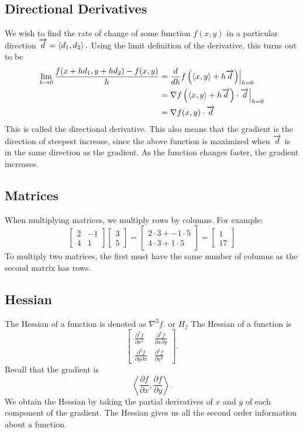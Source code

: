 \documentclass[12pt]{article}
\theoremstyle{plain} %
\theoremstyle{definition}
\theoremstyle{definition}
\theoremstyle{definition}
\theoremstyle{remark}
\newcommand{\angled}[1]{\left\langle {#1} \right\rangle}
\newcommand*{\vv}[1]{\overrightarrow{\mkern0mu#1}}
\begin{document}
\subsection{Directional Derivatives}
We wish to find the rate of change of some function $f(x,y)$ in a particular direction $\vv{d} = \angled{d_1,d_2}.$ Using the limit definition of the derivative, this turns out to be
\begin{align*} \lim_{h\to 0} \frac{f(x+hd_1,y+hd_2)-f(x,y)}{h} & =
\frac{d}{dh} f\left(\angled{x,y} + h\vv{d}\right) \Bigr\rvert_{h = 0} \\
& = \nabla f\left(\angled{x,y} + h \vv{d}\right) \cdot \vv{d} \Bigr\rvert_{h = 0} \\
&= \nabla f(x,y) \cdot \vv{d}
\end{align*}
This is called the directional derivative. This also means that the gradient is the direction of steepest increase, since the above function is maximized when $\vv{d}$ is in the same direction as the gradient. As the function changes faster, the gradient increases.

\subsection{Matrices}
When multiplying matrices, we multiply rows by columns. For example:
\[ \begin{bmatrix}
        2 & -1 \\
        4 & 1
    \end{bmatrix}
    \begin{bmatrix}
        3 \\ 5
    \end{bmatrix} =
    \begin{bmatrix}
        2\cdot3 + -1 \cdot 5 \\ 4 \cdot 3 + 1 \cdot 5
    \end{bmatrix} =
    \begin{bmatrix}
        1 \\ 17
    \end{bmatrix}
\]
To multiply two matrices, the first must have the same number of columns as the second matrix has rows.
\subsection{Hessian}
The Hessian of a function is denoted as $\nabla^2 f.$ or $H_f$ The Hessian of a function is
\[ \begin{bmatrix}
    \frac{\partial^2 f}{\partial x^2} & \frac{\partial^2 f}{\partial x \partial y} \\
    \frac{\partial^2 f}{\partial y \partial x} & \frac{\partial^2 f}{\partial y^2}
\end{bmatrix}. \]
Recall that the gradient is \[\angled{\frac{\partial f}{\partial x},\frac{\partial f}{\partial y}}.\] We obtain the Hessian by taking the partial derivatives of $x$ and $y$ of each component of the gradient. The Hessian gives us all the second order information about a function.
\end{document}
